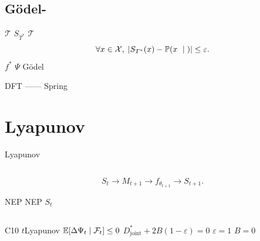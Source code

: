 \subsection{G\"{o}del-}

 $\mathcal{T}$  $S_{T^*}$  $\mathcal{T}$ 
\begin{equation}
    \forall x \in \mathcal{X}, \; |S_{T^*}(x) - \mathbb{P}(x \text{ } \mid \text{})| \leq \varepsilon.
\end{equation}
 $f^*$  $\Psi$ G\"{o}del 

\textbf{} DFT —— Spring \textit{}

\section{Lyapunov }\label{sec:lyapunov}

 Lyapunov 

\subsection{}

\textbf{}

\begin{equation}
    S_t \xrightarrow{\text{}} M_{t+1} \xrightarrow{\text{}} f_{\theta_{t+1}} \xrightarrow{\text{}} S_{t+1}.
\end{equation}

NEP NEP  $S_t$ 

\subsection{}

\begin{theorem}[ Lyapunov  ()]\label{thm:impossible}
C10 $t$Lyapunov  $\mathbb{E}[\Delta\Psi_t \mid \mathcal{F}_t] \leq 0$ \textbf{} $D_{\text{joint}}^* + 2B(1-\varepsilon) = 0$ $\varepsilon = 1$ $B = 0$
\end{theorem}

